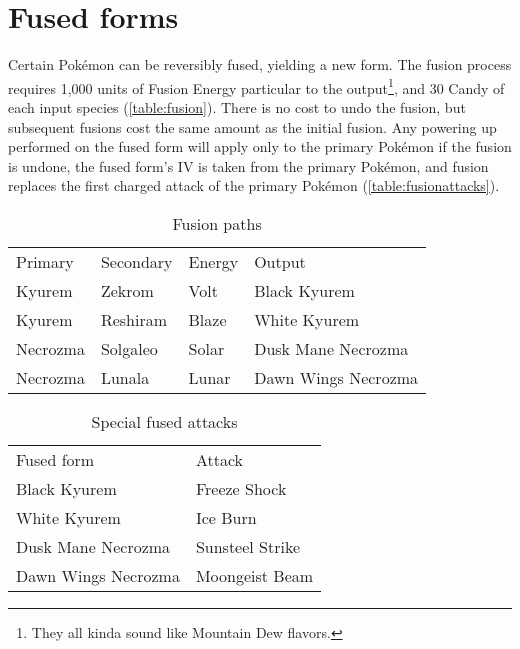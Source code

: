\section{Fused forms}
\label{sec:fusion}
Certain Pokémon can be reversibly fused, yielding a new form.
The fusion process requires 1,000 units of Fusion Energy particular to the output\footnote{They all kinda sound like Mountain Dew flavors.},
 and 30 Candy of each input species (\autoref{table:fusion}).
There is no cost to undo the fusion, but subsequent fusions cost the same amount as the initial fusion.
Any powering up performed on the fused form will apply only to the primary
  Pokémon if the fusion is undone, the fused form's IV is taken from the primary Pokémon,
  and fusion replaces the first charged attack of the primary Pokémon (\autoref{table:fusionattacks}).
\begin{table}[hb]
\centering
\begin{tabular}{llll}
  Primary & Secondary & Energy & Output\\
\Midrule
  Kyurem & Zekrom & Volt & Black Kyurem \\
  Kyurem & Reshiram & Blaze & White Kyurem \\
  Necrozma & Solgaleo & Solar & Dusk Mane Necrozma \\
  Necrozma & Lunala & Lunar & Dawn Wings Necrozma \\
\end{tabular}
  \caption{Fusion paths}
  \label{table:fusion}
\end{table}
\begin{table}[hb]
\centering
\begin{tabular}{ll}
  Fused form & Attack\\
\Midrule
  Black Kyurem & Freeze Shock \\
  White Kyurem & Ice Burn\\
  Dusk Mane Necrozma & Sunsteel Strike\\
  Dawn Wings Necrozma & Moongeist Beam\\
\end{tabular}
  \caption{Special fused attacks}
  \label{table:fusionattacks}
\end{table}

